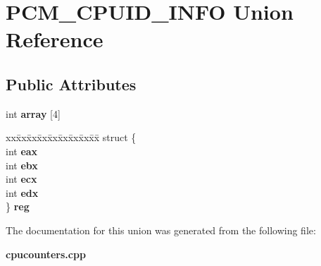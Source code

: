 \section{P\+C\+M\+\_\+\+C\+P\+U\+I\+D\+\_\+\+I\+N\+F\+O Union Reference}
\label{unionPCM__CPUID__INFO}
\subsection*{Public Attributes}
\begin{DoxyCompactItemize}
\item 
int {\bfseries array} [4]\label{unionPCM__CPUID__INFO_ad6b8b5c108abcb429d64f6c27f4febe0}

\item 
\begin{tabbing}
xx\=xx\=xx\=xx\=xx\=xx\=xx\=xx\=xx\=\kill
struct \{\\
\>int {\bfseries eax}\\
\>int {\bfseries ebx}\\
\>int {\bfseries ecx}\\
\>int {\bfseries edx}\\
\} {\bfseries reg}\label{unionPCM__CPUID__INFO_a2f6fdd256c2243989c717f14155820c3}
\\

\end{tabbing}\end{DoxyCompactItemize}


The documentation for this union was generated from the following file\+:\begin{DoxyCompactItemize}
\item 
{\bf cpucounters.\+cpp}\end{DoxyCompactItemize}
